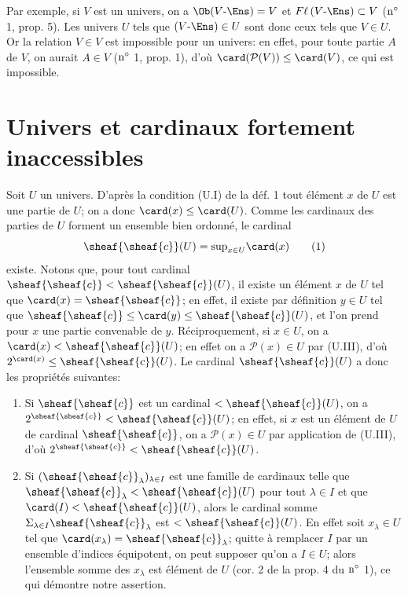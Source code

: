 Par exemple, si $V$ est un univers, on a $\Ob(V\text{-}\Ens)=V$ et
$F\ell\, (V\text{-}\Ens)\subset V$ (${\rm n^{\circ}}$ 1, prop. 5).
Les univers $U$ tels que $(V\text{-}\Ens)\in U$ sont donc ceux tels
que $V\in U$. Or la relation $V\in V$ est impossible pour un
univers: en effet, pour toute partie $A$ de $V$, on aurait $A\in V$
(${\rm n^{\circ}}$ 1, prop. 1), d'où $\card(\mathcal{P}(V))\leq
\card(V)$, ce qui est impossible.

\section{Univers et cardinaux fortement inaccessibles}\pageoriginale

Soit $U$ un univers. D'après la condition (U.I) de la déf. 1 tout
élément $x$ de $U$ est une partie de $U$; on a donc $\card(x)\leq
\card(U)$. Comme les cardinaux des parties de $U$ forment un
ensemble bien ordonné, le cardinal
\begin{equation}
\sheaf{\sheaf{c}}(U)={\sup}_{x\in U}\card(x)\tag{1}
\end{equation}
existe. Notons que, pour tout cardinal
$\sheaf{\sheaf{c}}<\sheaf{\sheaf{c}}(U)$, il existe un élément $x$
de $U$ tel que $\card(x)=\sheaf{\sheaf{c}}$; en effet, il existe par
définition $y\in U$ tel que $\sheaf{\sheaf{c}}\leq \card(y)\leq
\sheaf{\sheaf{c}}(U)$, et l'on prend pour $x$ une partie convenable
de $y$. Réciproquement, si $x\in U$, on a
$\card(x)<\sheaf{\sheaf{c}}(U)$; en effet on a $\mathcal{P}(x)\in U$
par (U.III), d'où $2^{\card(x)}\leq \sheaf{\sheaf{c}}(U)$. Le
cardinal $\sheaf{\sheaf{c}}(U)$ a donc les propriétés suivantes:

\begin{enumerate}
\renewcommand{\labelenumi}{\theenumi)}
\item Si $\sheaf{\sheaf{c}}$ est un cardinal $<\sheaf{\sheaf{c}}(U)$, on a
$2^{\sheaf{\sheaf{c}}}<\sheaf{\sheaf{c}}(U)$; en effet, si $x$ est
un élément de $U$ de cardinal $\sheaf{\sheaf{c}}$, on a
$\mathcal{P}(x)\in U$ par application de (U.III), d'où
$2^{\sheaf{\sheaf{c}}}<\sheaf{\sheaf{c}}(U)$.

\item Si $(\sheaf{\sheaf{c}}_{\lambda})_{\lambda\in I}$ est une famille de
cardinaux telle que
$\sheaf{\sheaf{c}}_{\lambda}<\sheaf{\sheaf{c}}(U)$ pour tout
$\lambda\in I$ et que $\card(I)<\sheaf{\sheaf{c}}(U)$, alors le
cardinal somme $\Sigma_{\lambda \in I} \sheaf{\sheaf{c}}_{\lambda}$
est $<\sheaf{\sheaf{c}}(U)$. En effet soit $x_{\lambda}\in U$ tel
que $\card(x_{\lambda})=\sheaf{\sheaf{c}}_{\lambda}$; quitte à
remplacer $I$ par un ensemble d'indices équipotent, on peut supposer
qu'on a $I\in U$; alors l'ensemble somme des $x_{\lambda}$ est
élément de $U$ (cor. 2 de la prop. 4 du ${\rm n^{\circ}}$ 1), ce qui
démontre notre assertion.
\end{enumerate}

